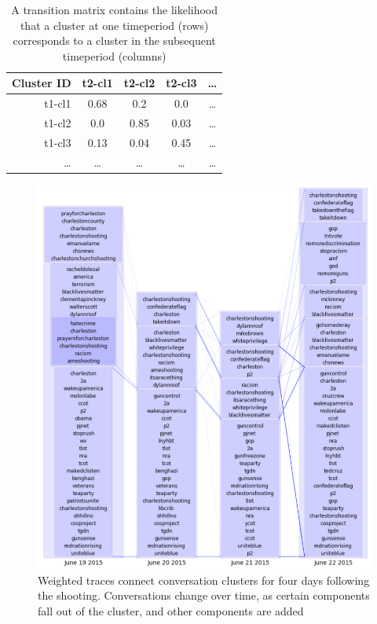 \documentclass[12pt]{article}
\begin{document}
\begin{table}[h]
	\caption{A  transition  matrix  contains  the  likelihood  that  a  cluster  at  one  timeperiod  (rows)  corresponds  to  a cluster in the subsequent timeperiod (columns)}
	
	\begin{center}
	  \begin{tabular}{| r | c  c  c  c |}
	    \hline
	    Cluster ID & t2-cl1   & t2-cl2   & t2-cl3   & \ldots \\ \hline
	    t1-cl1     & 0.68     & 0.2      & 0.0      & \ldots \\ 
	    t1-cl2     & 0.0      & 0.85     & 0.03     & \ldots \\
	    t1-cl3     & 0.13     & 0.04     & 0.45     & \ldots \\
	    \ldots     & \ldots   & \ldots   & \ldots   & \ldots \\
	    \hline
	  \end{tabular}
	\end{center}
	\label{tab:transition_matrix}
\end{table}

\begin{figure}[!ht]
  \centering
    \includegraphics[width=1.0\textwidth]{F7_multi_day_cluster.png}
    \caption{Weighted  traces  connect  conversation  clusters  for  four  days  following  the  shooting. Conversations change over time, as certain components fall out of the cluster, and other components are added}
  \label{fig:multi_day_cluster}
\end{figure}
\end{document}
